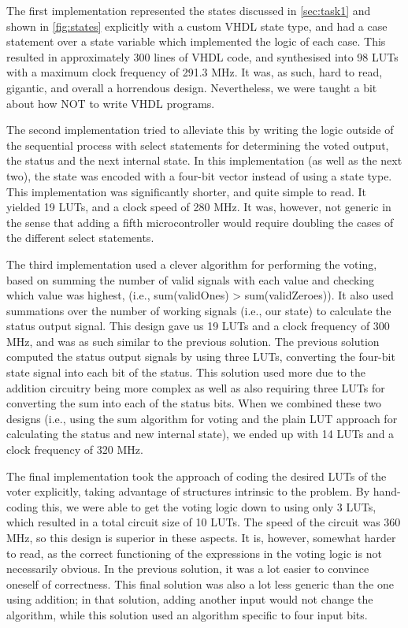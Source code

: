 \documentclass[11pt]{article}
\newcommand{\ie}{i.e.,\xspace}
\begin{document}
The first implementation represented the states discussed in
\autoref{sec:task1} and shown in \autoref{fig:states} explicitly with a custom VHDL state type, and had
a case statement over a state variable which implemented the logic of
each case. This resulted in approximately 300 lines of VHDL code, and
synthesised into 98 LUTs with a maximum clock frequency of 291.3
MHz. It was, as such, hard to read, gigantic, and overall a horrendous
design. Nevertheless, we were taught a bit about how NOT to write VHDL
programs.

The second implementation tried to alleviate this by writing the logic
outside of the sequential process with select statements for
determining the voted output, the status and the next internal
state. In this implementation (as well as the next two), the state was
encoded with a four-bit vector instead of using a state type. This
implementation was significantly shorter, and quite simple to read. It
yielded 19 LUTs, and a clock speed of 280 MHz. It was, however, not
generic in the sense that adding a fifth microcontroller would require
doubling the cases of the different select statements. 

The third implementation used a clever algorithm for performing the
voting, based on summing the number of valid signals with each value
and checking which value was highest, (\ie sum(validOnes) \textgreater
sum(validZeroes)). It also used summations over the number of working
signals (\ie our state) to calculate the status output signal. This
design gave us 19 LUTs and a clock frequency of 300 MHz, and was as
such similar to the previous solution. The previous solution computed
the status output signals by using three LUTs, converting the four-bit
state signal into each bit of the status. This solution used more due
to the addition circuitry being more complex as well as also requiring
three LUTs for converting the sum into each of the status bits. When
we combined these two designs (\ie using the sum algorithm for voting
and the plain LUT approach for calculating the status and new internal
state), we ended up with 14 LUTs and a clock frequency of 320 MHz.

The final implementation took the approach of coding the desired LUTs
of the voter explicitly, taking advantage of structures intrinsic to
the problem. By hand-coding this, we were able to get the voting logic
down to using only 3 LUTs, which resulted in a total circuit size of
10 LUTs. The speed of the circuit was 360 MHz, so this design is
superior in these aspects. It is, however, somewhat harder to read, as
the correct functioning of the expressions in the voting logic is not
necessarily obvious. In the previous solution, it was a lot easier to
convince oneself of correctness. This final solution was also a lot
less generic than the one using addition; in that solution, adding
another input would not change the algorithm, while this solution used
an algorithm specific to four input bits. 
\end{document}
